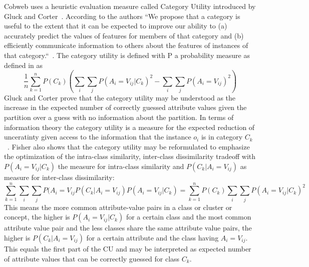 \noindent Cobweb uses a heuristic evaluation measure called Category Utility introduced by Gluck and Corter~\cite{gluck1985information}. According to the authors ``We propose that a category is useful to the extent that it can be expected to improve our ability to (a) accurately predict the values of features for members of that category and (b) efficiently communicate information to others about the features of instances of that category.``~\cite{gluck1985information}. 
The category utility is defined with P a probability measure as defined in  as
\[ \frac{1}{n} \sum_{k = 1}^n P(C_k) ( \sum_i \sum_j P(A_i = V_{ij}| C_k)^2 - \sum_i \sum_j P(A_i = V_{ij})^2) \]
\noindent Gluck and Corter prove that the category utility may be understood as the increase in the expected number of correctly guessed attribute values given the partition over a guess with no information about the partition. In terms of information theory the category utility is a measure for the expected reduction of unceratinty given access to the information that the instance $o_i$ is in category $C_k$~\cite{corter1992explaining}. Fisher also shows that the category utility may be reformulated to emphasize the optimization of the intra-class similarity, inter-class dissimilarity tradeoff with $P(A_i = V_{ij} | C_k)$ the measure for intra-class similarity and $P(C_k | A_i = V_{ij})$ as measure for inter-class dissimilarity: \[ \sum_{k = 1}^n \sum_i \sum_j P(A_i = V_{ij} P(C_k| A_i = V_{ij})P(A_i = V_{ij}| C_k) = \sum_{k = 1}^n P(C_k) \sum_i \sum_j P(A_i = V_{ij}| C_k)^2 \]
This means the more common attribute-value pairs in a class or cluster or concept, the higher is $P(A_i = V_{ij} | C_k)$ for a certain class and the most common attribute value pair and the less classes share the same attribute value pairs, the higher is $P(C_k | A_i = V_{ij})$ for a certain attribute and the class having $A_i = V_{ij}$.
This equals the first part of the CU and may be interpreted as expected number of attribute values that can be correctly guessed for class $C_k$. \\

